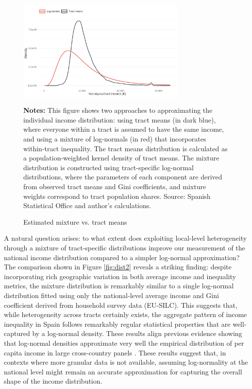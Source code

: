 \begin{figure}[H]
\begin{center}
\captionsetup{justification=centering}
\caption{Estimated mixture vs. tract means}
\label{fig:distributions}
\includegraphics[width=0.75\textwidth]{output/tract_vs_individual_income_distribution.png}
\end{center}
\begin{fignotes2}
\textbf{Notes:} This figure shows two approaches to approximating the individual income distribution: using tract means (in dark blue), where everyone within a tract is assumed to have the same income, and using a mixture of log-normals (in red) that incorporates within-tract inequality. The tract means distribution is calculated as a population-weighted kernel density of tract means. The mixture distribution is constructed using tract-specific log-normal distributions, where the parameters of each component are derived from observed tract means and Gini coefficients, and mixture weights correspond to tract population shares. Source: Spanish Statistical Office and author's calculations.
\end{fignotes2}
\end{figure}

A natural question arises: to what extent does exploiting local-level heterogeneity through a mixture of tract-specific distributions improve our measurement of the national income distribution compared to a simpler log-normal approximation? The comparison shown in Figure \ref{fig:dist2} reveals a striking finding: despite incorporating rich geographic variation in both average income and inequality metrics, the mixture distribution is remarkably similar to a single log-normal distribution fitted using only the national-level average income and Gini coefficient derived from household survey data (EU-SILC). This suggests that, while heterogeneity across tracts certainly exists, the aggregate pattern of income inequality in Spain follows remarkably regular statistical properties that are well-captured by a log-normal density. These results align previous evidence showing that log-normal densities approximate very well the empirical distribution of per capita income in large cross-country panels \citep{lopez2006normal}. These results suggest that, in contexts where more granular data is not available, assuming log-normality at the national level might remain an accurate approximation for capturing the overall shape of the income distribution.

